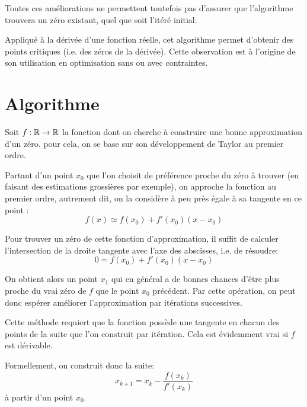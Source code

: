 Toutes ces améliorations ne permettent toutefois pas d'assurer que l'algorithme trouvera un zéro 
existant, quel que soit l'itéré initial.

\medskip
Appliqué à la dérivée d'une fonction réelle, cet algorithme permet d'obtenir des points critiques 
(i.e. des zéros de la dérivée). Cette observation est à l'origine de son utilisation en optimisation 
sans ou avec contraintes.


\medskip
\section{Algorithme}

Soit $f: \mathbb R\rightarrow\mathbb R$ la fonction dont on cherche à construire une bonne approximation d'un zéro.
pour cela, on se base sur son développement de Taylor au 
premier ordre. 

Partant d'un point $x_0$ que l'on choisit de préférence proche du zéro à trouver (en faisant des estimations 
grossières par exemple), on approche la fonction au premier ordre, autrement dit, on la considère à peu 
près égale à sa tangente en ce point :
\begin{equation} f(x)\simeq f(x_0) + f'(x_0)(x-x_0) \end{equation}

Pour trouver un zéro de cette fonction d'approximation, il suffit de calculer l'intersection de la droite tangente 
avec l'axe des abscisses, i.e. de résoudre:
\begin{equation} 0=f(x_0) + f'(x_0)(x-x_0) \end{equation}

On obtient alors un point $x_1$ qui en général a de bonnes chances d'être plus proche du vrai zéro de $f$ 
que le point $x_0$ précédent. 
Par cette opération, on peut donc espérer améliorer l'approximation par itérations successives.

Cette méthode requiert que la fonction possède une tangente en chacun des points de la suite que l'on 
construit par itération. Cela est évidemment vrai si $f$ est dérivable.

\medskip
Formellement, on construit donc la suite:
\begin{equation} x_{k+1} = x_k - \frac{f(x_k)}{f'(x_k)} \end{equation}
à partir d'un point $x_0$.

